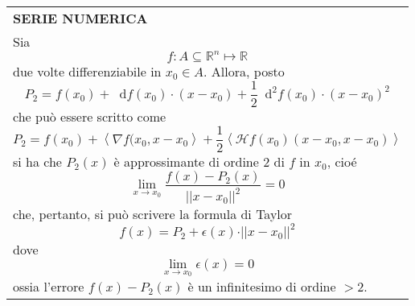 \documentclass[a4paper]{extarticle}
\renewcommand\arraystretch{}
\newcommand*\dif{\mathop{}\!\mathrm{d}}
\begin{document}
\vspace{1em}
\setlength{\tabcolsep}{14pt}
\renewcommand{\arraystretch}{2}
\noindent
\begin{tabularx}{\textwidth}{@{}|P|@{}}
    \hline
    {\textbf{SERIE NUMERICA}}\\
    \parbox{\linewidth}{Sia
    \[f : A \subseteq \mathbb{R}^n \longmapsto \mathbb{R}\]
    due volte differenziabile in $x_0 \in A$. Allora, posto
    \[P_2 = f(x_0) + \dif f(x_0) \cdot (x-x_0) + \dfrac{1}{2} \dif^2f(x_0) \cdot (x-x_0)^2\]
    che può essere scritto come
    \[P_2 = f(x_0) + \left<\nabla f(x_0,x-x_0\right> + \dfrac{1}{2} \left<\mathcal{H} f(x_0) (x-x_0, x-x_0)\right>\]
    si ha che $P_2(x)$ è approssimante di ordine $2$ di $f$ in $x_0$, cioé
    \[\lim_{x \to x_0} \dfrac{f(x) - P_2(x)}{\vert \vert x-x_0 \vert \vert^2} = 0\]
    che, pertanto, si può scrivere la formula di Taylor
    \[f(x)=P_2 + \epsilon(x) \cdot \vert \vert x-x_0 \vert \vert^2\]
    dove
    \[\lim_{x \to x_0} \epsilon(x)=0\]
    ossia l'errore $f(x)-P_2(x)$ è un infinitesimo di ordine $>2$.
    \vspace{3mm}}\\
    \hline
\end{tabularx}
\end{document}
